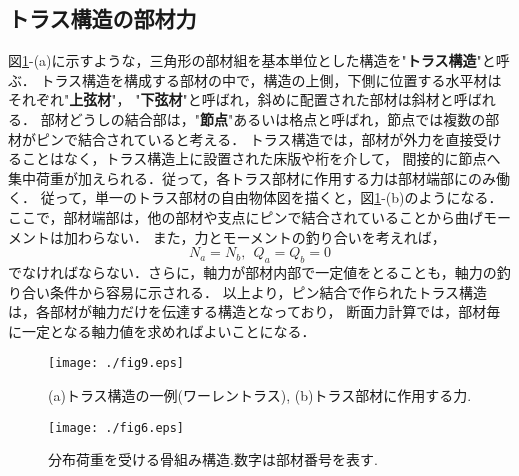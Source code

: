\documentclass[10pt,a4j]{jarticle}
\begin{document}
\subsection{トラス構造の部材力}
図\ref{fig:fig12_9}-(a)に示すような，三角形の部材組を基本単位とした構造を"{\bf トラス構造}"と呼ぶ．
トラス構造を構成する部材の中で，構造の上側，下側に位置する水平材はそれぞれ"{\bf 上弦材}"，
"{\bf 下弦材}"と呼ばれ，斜めに配置された部材は斜材と呼ばれる．
部材どうしの結合部は，"{\bf 節点}"あるいは格点と呼ばれ，節点では複数の部材がピンで結合されていると考える．
トラス構造では，部材が外力を直接受けることはなく，トラス構造上に設置された床版や桁を介して，
間接的に節点へ集中荷重が加えられる．従って，各トラス部材に作用する力は部材端部にのみ働く．
従って，単一のトラス部材の自由物体図を描くと，図\ref{fig:fig12_9}-(b)のようになる．
ここで，部材端部は，他の部材や支点にピンで結合されていることから曲げモーメントは加わらない．
また，力とモーメントの釣り合いを考えれば，
\begin{equation}
	N_a=N_b, \ \ Q_a=Q_b=0
\end{equation}
でなければならない．さらに，軸力が部材内部で一定値をとることも，軸力の釣り合い条件から容易に示される．
以上より，ピン結合で作られたトラス構造は，各部材が軸力だけを伝達する構造となっており，
断面力計算では，部材毎に一定となる軸力値を求めればよいことになる．
\begin{figure}[h]
	\begin{center}
	\texttt{[image: ./fig9.eps]} 
	\end{center}
	\caption{
		(a)トラス構造の一例(ワーレントラス), (b)トラス部材に作用する力. 
	} 
	\label{fig:fig12_9}
\end{figure}
\begin{figure}[h]
	\begin{center}
	\texttt{[image: ./fig6.eps]} 
	\end{center}
	\caption{
		分布荷重を受ける骨組み構造.数字は部材番号を表す.
	} 
	\label{fig:fig12_6}
\end{figure}
\end{document}
